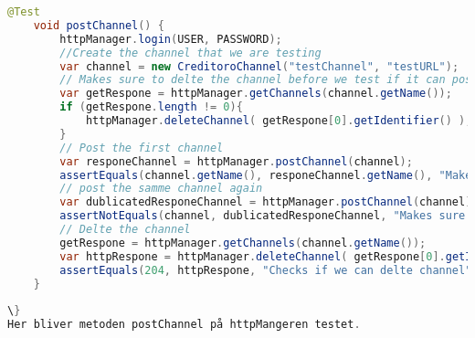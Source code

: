 \begin{lstlisting}[language=java, caption=HttpManagerTest.java, firstnumber=32]
    @Test
    void postChannel() {
        httpManager.login(USER, PASSWORD);
        //Create the channel that we are testing
        var channel = new CreditoroChannel("testChannel", "testURL");
        // Makes sure to delte the channel before we test if it can post.
        var getRespone = httpManager.getChannels(channel.getName());
        if (getRespone.length != 0){
            httpManager.deleteChannel( getRespone[0].getIdentifier() );
        }
        // Post the first channel
        var responeChannel = httpManager.postChannel(channel);
        assertEquals(channel.getName(), responeChannel.getName(), "Makes sure it it gets the same channels as it posted");
        // post the samme channel again
        var dublicatedResponeChannel = httpManager.postChannel(channel);
        assertNotEquals(channel, dublicatedResponeChannel, "Makes sure it can't post dublicate");
        // Delte the channel 
        getRespone = httpManager.getChannels(channel.getName());
        var httpRespone = httpManager.deleteChannel( getRespone[0].getIdentifier() );
        assertEquals(204, httpRespone, "Checks if we can delte channel");
    }
   
\}
Her bliver metoden postChannel på httpMangeren testet.

\end{lstlisting}